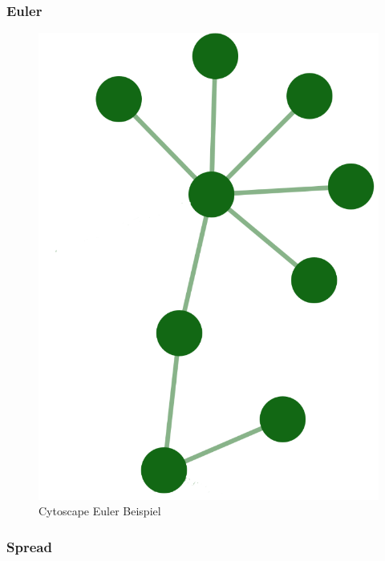 \subsubsection{Euler}\label{sec:cytoscape-euler}

\begin{figure}[H] 
    \begin{center}
        \includegraphics[scale=0.5]{images/cytoscape-euler-example.png}
        \caption{Cytoscape Euler Beispiel \cite{cytoscape_euler}}
        \label{abb:cytoscape-spread-example}
    \end{center}    
\end{figure}

\subsubsection{Spread}\label{sec:cytoscape-spread}

